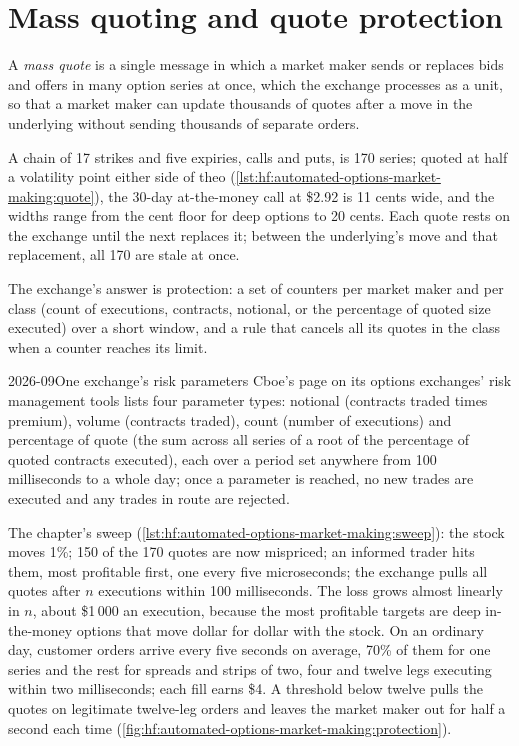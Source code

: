 \section{Mass quoting and quote protection}

\begin{definition}\label{def:hf:automated-options-market-making:mass}
A \emph{mass quote} is a single message in which a market maker sends or replaces bids and offers in many option series at
once, which the exchange processes as a unit, so that a market maker can update thousands of quotes after a move in the underlying without sending
thousands of separate orders.
\end{definition}

A chain of 17 strikes and five expiries, calls and puts, is 170 series; quoted at half a volatility point either side of theo
(\cref{lst:hf:automated-options-market-making:quote}), the 30-day at-the-money call at \$2.92 is 11 cents wide, and the widths range from the cent
floor for deep options to 20 cents. Each quote rests on the exchange until the next  replaces it; between the underlying's move and that
replacement, all 170 are stale at once.

The exchange's answer is protection: a set of counters per market maker and per class (count of executions, contracts, notional, or the percentage
of quoted size executed) over a short window, and a rule that cancels all its quotes in the class when a counter reaches its limit.

\begin{dated}{2026-09}{One exchange's risk parameters}\label{dat:hf:automated-options-market-making:cboe}
Cboe's page on its options exchanges' risk management tools lists four parameter types: notional (contracts traded times premium), volume (contracts
traded), count (number of executions) and percentage of quote (the sum across all series of a root of the percentage of quoted contracts
executed), each over a period set anywhere from 100 milliseconds to a whole day; once a parameter is reached, no new trades are executed and any
trades in route are rejected.
\end{dated}

The chapter's sweep (\cref{lst:hf:automated-options-market-making:sweep}): the stock moves 1\%; 150 of the 170 quotes are now mispriced; an informed
trader hits them, most profitable first, one every five microseconds; the exchange pulls all quotes after $n$ executions within 100 milliseconds.
The loss grows almost linearly in $n$, about \$1\,000 an execution, because the most profitable targets are deep in-the-money options that move
dollar for dollar with the stock. On an ordinary day, customer orders arrive every five seconds on average, 70\% of them for one series and the rest
for spreads and strips of two, four and twelve legs executing within two milliseconds; each fill earns \$4. A threshold below twelve pulls the
quotes on legitimate twelve-leg orders and leaves the market maker out for half a second each time
(\cref{fig:hf:automated-options-market-making:protection}).

